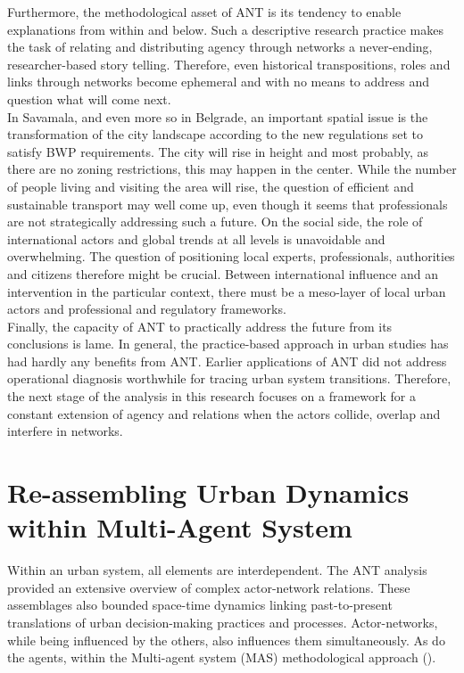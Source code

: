 \documentclass[11pt]{report}
\begin{document}
Furthermore, the methodological asset of ANT is its tendency to enable explanations from within and below.
Such a descriptive research practice makes the task of relating and distributing agency through networks a never-ending, researcher-based story telling.
Therefore, even historical transpositions, roles and links through networks become ephemeral and with no means to address and question what will come next.
\\
 
In Savamala, and even more so in Belgrade, an important spatial issue is the transformation of the city landscape according to the new regulations set to satisfy BWP requirements. The city will rise in height and most probably, as there are no zoning restrictions, this may happen in the center. While the number of people living and visiting the area will rise, the question of efficient and sustainable transport may well come up, even though it seems that professionals are not strategically addressing such a future. On the social side, the role of international actors and global trends at all levels is unavoidable and overwhelming. The question of positioning local experts, professionals, authorities and citizens therefore might be crucial. Between international influence and an intervention in the particular context, there must be a meso-layer of local urban actors and professional and regulatory frameworks.
\\

Finally, the capacity of ANT to practically address the future from its conclusions is lame. In general, the practice-based approach in urban studies has had hardly any benefits from ANT. Earlier applications of ANT did not address operational diagnosis worthwhile for tracing urban system transitions. Therefore, the next stage of the analysis in this research focuses on a framework for a constant extension of agency and relations when the actors collide, overlap and interfere in networks. 

\chapter{Re-assembling Urban Dynamics within Multi-Agent System}


Within an urban system, all elements are interdependent.
The ANT analysis provided an extensive overview of complex  actor-network relations. These assemblages also bounded space-time dynamics linking past-to-present translations of urban decision-making practices and processes. Actor-networks, while being influenced by the others, also influences them simultaneously. As do the agents, within the Multi-agent system (MAS) methodological approach (\href{Bousquet}{\citealt{bousquet_multi-agent_2004}}).
\\
\end{document}
